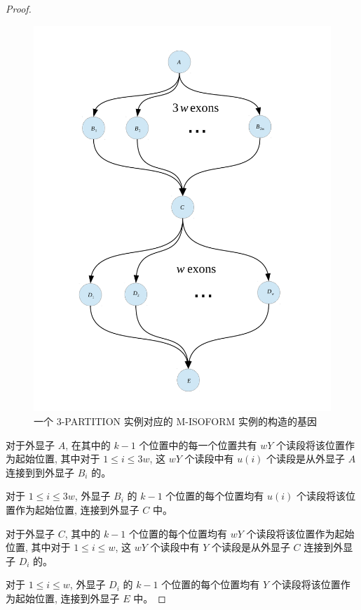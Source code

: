 \begin{proof}
\begin{figure}[!t]
\centering
\includegraphics[width=1.0\textwidth]{figures/nphard/part3-gene.pdf}
\caption{一个 3-PARTITION 实例对应的 M-ISOFORM 实例的构造的基因}
\label{tripart-reduce-gene}
\end{figure}

对于外显子 $A$, 在其中的 $k-1$ 个位置中的每一个位置共有 $wY$ 个读段将该位置作为起始位置, 
其中对于 $1\leq i\leq 3w$, 
这 $wY$ 个读段中有 $u(i)$ 个读段是从外显子 $A$ 连接到到外显子 $B_i$ 的。 

对于 $1\leq i\leq 3w$, 
外显子 $B_i$ 的 $k-1$ 个位置的每个位置均有 $u(i)$ 个读段将该位置作为起始位置, 
连接到外显子 $C$ 中。 

对于外显子 $C$, 其中的 $k-1$ 个位置的每个位置均有 $wY$ 个读段将该位置作为起始位置, 
其中对于 $1\leq i \leq w$,
这 $wY$ 个读段中有 $Y$ 个读段是从外显子 $C$ 连接到外显子 $D_i$ 的。 

对于 $1\leq i \leq w$,
外显子 $D_i$ 的 $k-1$ 个位置的每个位置均有 $Y$ 个读段将该位置作为起始位置, 
连接到外显子 $E$ 中。 


\end{proof}
